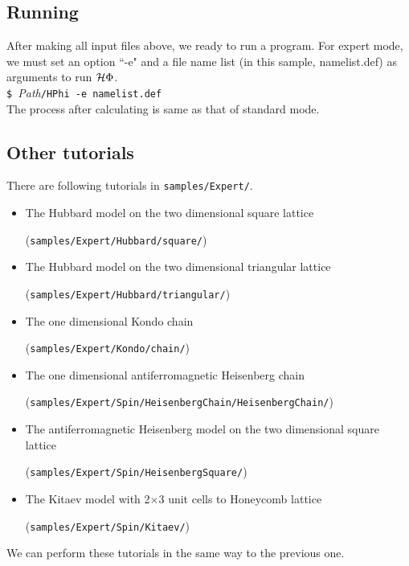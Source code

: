\subsection{Running}
After making all input files above, we ready to run a program. For expert mode, we must set an option ``-e" and a file name list (in this sample, namelist.def) as arguments to run $\mathcal{H} \Phi$.\\
\verb|$ |\textit{Path}\verb|/HPhi -e namelist.def|\\
The process after calculating is same as that of standard mode.

\subsection{Other tutorials}

There are following tutorials in \verb|samples/Expert/|.

\begin{itemize}
\item The Hubbard model on the two dimensional square lattice

  (\verb|samples/Expert/Hubbard/square/|)
\item The Hubbard model on the two dimensional triangular lattice
  
  (\verb|samples/Expert/Hubbard/triangular/|)
\item The one dimensional Kondo chain

  (\verb|samples/Expert/Kondo/chain/|)
\item The one dimensional antiferromagnetic Heisenberg chain
  
  (\verb|samples/Expert/Spin/HeisenbergChain/HeisenbergChain/|)
\item The antiferromagnetic Heisenberg model on the two dimensional square lattice
  
  (\verb|samples/Expert/Spin/HeisenbergSquare/|)
      
\item The Kitaev model with 2$\times$3 unit cells to Honeycomb lattice

  (\verb|samples/Expert/Spin/Kitaev/|)

\end{itemize}

We can perform these tutorials in the same way to the previous one.

\newpage
